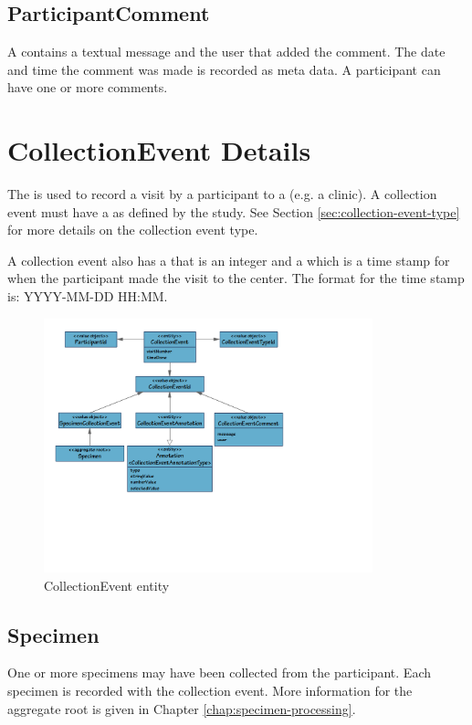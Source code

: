 \subsection*{ParticipantComment}
A  contains a textual message and the user
that added the comment. The date and time the comment was made is recorded as
meta data. A participant can have one or more comments.

\section{CollectionEvent Details}

The  is used to record a visit by a participant
to a  (e.g. a clinic). A collection event must have a
 as defined by the study. See Section
\ref{sec:collection-event-type} for more details on the collection event type.

A collection event also has a  that is an integer and a
 which is a time stamp for when the participant made the
visit to the center. The format for the time stamp is: YYYY-MM-DD HH:MM.

\begin{figure}[H]
  \centering
  \includegraphics[trim={10mm 66mm 75mm 10mm}, clip,
    width=0.85\textwidth]{images/collection-event}
  \caption{CollectionEvent entity}
  \label{fig:collection-event}
\end{figure}

\subsection*{Specimen}
One or more specimens may have been collected from the participant. Each
specimen is recorded with the collection event. More information for the
 aggregate root is given in Chapter
\ref{chap:specimen-processing}.

